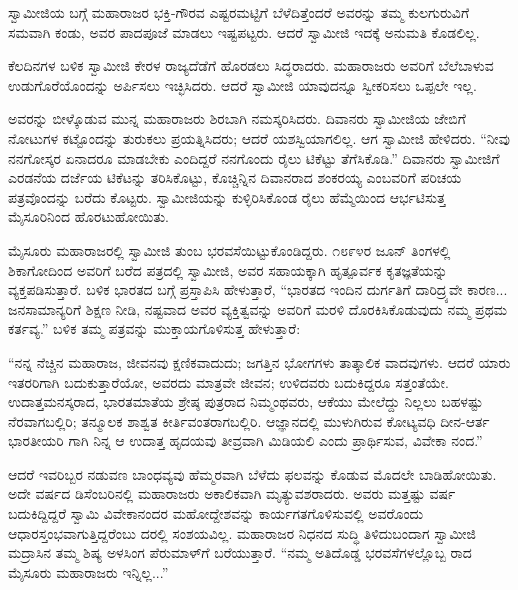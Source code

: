ಸ್ವಾಮೀಜಿಯ ಬಗ್ಗೆ ಮಹಾರಾಜರ ಭಕ್ತಿ-ಗೌರವ ಎಷ್ಟರಮಟ್ಟಿಗೆ ಬೆಳೆದಿತ್ತೆಂದರೆ ಅವರನ್ನು ತಮ್ಮ ಕುಲಗುರುವಿಗೆ ಸಮವಾಗಿ ಕಂಡು, ಅವರ ಪಾದಪೂಜೆ ಮಾಡಲು ಇಷ್ಟಪಟ್ಟರು. ಆದರೆ ಸ್ವಾಮೀಜಿ ಇದಕ್ಕೆ ಅನುಮತಿ ಕೊಡಲಿಲ್ಲ.

ಕೆಲದಿನಗಳ ಬಳಿಕ ಸ್ವಾಮೀಜಿ ಕೇರಳ ರಾಜ್ಯದೆಡೆಗೆ ಹೊರಡಲು ಸಿದ್ಧರಾದರು. ಮಹಾರಾಜರು ಅವರಿಗೆ ಬೆಲೆಬಾಳುವ ಉಡುಗೊರೆಯೊಂದನ್ನು ಅರ್ಪಿಸಲು ಇಚ್ಛಿಸಿದರು. ಆದರೆ ಸ್ವಾಮೀಜಿ ಯಾವುದನ್ನೂ ಸ್ವೀಕರಿಸಲು ಒಪ್ಪಲೇ ಇಲ್ಲ.

ಅವರನ್ನು ಬೀಳ್ಕೊಡುವ ಮುನ್ನ ಮಹಾರಾಜರು ಶಿರಬಾಗಿ ನಮಸ್ಕರಿಸಿದರು. ದಿವಾನರು ಸ್ವಾಮೀಜಿಯ ಜೇಬಿಗೆ ನೋಟುಗಳ ಕಟ್ಟೊಂದನ್ನು ತುರುಕಲು ಪ್ರಯತ್ನಿಸಿದರು; ಆದರೆ ಯಶಸ್ವಿಯಾಗಲಿಲ್ಲ. ಆಗ ಸ್ವಾಮೀಜಿ ಹೇಳಿದರು. “ನೀವು ನನಗೋಸ್ಕರ ಏನಾದರೂ ಮಾಡಬೇಕು ಎಂದಿದ್ದರೆ ನನಗೊಂದು ರೈಲು ಟಿಕೆಟ್ಟು ತೆಗೆಸಿಕೊಡಿ.” ದಿವಾನರು ಸ್ವಾಮೀಜಿಗೆ ಎರಡನೆಯ ದರ್ಜೆಯ ಟಿಕೆಟನ್ನು ತರಿಸಿಕೊಟ್ಟು, ಕೊಚ್ಚಿನ್ನಿನ ದಿವಾನರಾದ ಶಂಕರಯ್ಯ ಎಂಬವರಿಗೆ ಪರಿಚಯ ಪತ್ರವೊಂದನ್ನು ಬರೆದು ಕೊಟ್ಟರು. ಸ್ವಾಮೀಜಿಯನ್ನು ಕುಳ್ಳಿರಿಸಿಕೊಂಡ ರೈಲು ಹೆಮ್ಮೆಯಿಂದ ಆರ್ಭಟಿಸುತ್ತ ಮೈಸೂರಿನಿಂದ ಹೊರಟುಹೋಯಿತು.

ಮೈಸೂರು ಮಹಾರಾಜರಲ್ಲಿ ಸ್ವಾಮೀಜಿ ತುಂಬ ಭರವಸೆಯಿಟ್ಟುಕೊಂಡಿದ್ದರು. ೧೮೯೪ರ ಜೂನ್ ತಿಂಗಳಲ್ಲಿ ಶಿಕಾಗೋದಿಂದ ಅವರಿಗೆ ಬರೆದ ಪತ್ರದಲ್ಲಿ ಸ್ವಾಮೀಜಿ, ಅವರ ಸಹಾಯಕ್ಕಾಗಿ ಹೃತ್ಪೂರ್ವಕ ಕೃತಜ್ಞತೆಯನ್ನು ವ್ಯಕ್ತಪಡಿಸುತ್ತಾರೆ. ಬಳಿಕ ಭಾರತದ ಬಗ್ಗೆ ಪ್ರಸ್ತಾಪಿಸಿ ಹೇಳುತ್ತಾರೆ, “ಭಾರತದ ಇಂದಿನ ದುರ್ಗತಿಗೆ ದಾರಿದ್ರ್ಯವೇ ಕಾರಣ... ಜನಸಾಮಾನ್ಯರಿಗೆ ಶಿಕ್ಷಣ ನೀಡಿ, ನಷ್ಟವಾದ ಅವರ ವ್ಯಕ್ತಿತ್ವವನ್ನು ಅವರಿಗೆ ಮರಳಿ ದೊರಕಿಸಿಕೊಡುವುದು ನಮ್ಮ ಪ್ರಥಮ ಕರ್ತವ್ಯ.” ಬಳಿಕ ತಮ್ಮ ಪತ್ರವನ್ನು ಮುಕ್ತಾಯಗೊಳಿಸುತ್ತ ಹೇಳುತ್ತಾರೆ:

“ನನ್ನ ನೆಚ್ಚಿನ ಮಹಾರಾಜ, ಜೀವನವು ಕ್ಷಣಿಕವಾದುದು; ಜಗತ್ತಿನ ಭೋಗಗಳು ತಾತ್ಕಾಲಿಕ ವಾದವುಗಳು. ಆದರೆ ಯಾರು ಇತರರಿಗಾಗಿ ಬದುಕುತ್ತಾರೆಯೋ, ಅವರದು ಮಾತ್ರವೇ ಜೀವನ; ಉಳಿದವರು ಬದುಕಿದ್ದರೂ ಸತ್ತಂತೆಯೇ.  ಉದಾತ್ತಮನಸ್ಕರಾದ, ಭಾರತಮಾತೆಯ ಶ್ರೇಷ್ಠ ಪುತ್ರರಾದ ನಿಮ್ಮಂಥವರು, ಆಕೆಯು ಮೇಲೆದ್ದು ನಿಲ್ಲಲು ಬಹಳಷ್ಟು ನೆರವಾಗಬಲ್ಲಿರಿ; ತನ್ಮೂಲಕ ಶಾಶ್ವತ ಕೀರ್ತಿವಂತರಾಗಬಲ್ಲಿರಿ. ಆಜ್ಞಾನದಲ್ಲಿ ಮುಳುಗಿರುವ ಕೋಟ್ಯವಧಿ ದೀನ-ಆರ್ತ ಭಾರತೀಯರಿ ಗಾಗಿ ನಿನ್ನ ಆ ಉದಾತ್ತ ಹೃದಯವು ತೀವ್ರವಾಗಿ ಮಿಡಿಯಲಿ ಎಂದು ಪ್ರಾರ್ಥಿಸುವ, ವಿವೇಕಾ ನಂದ.”

ಆದರೆ ಇವರಿಬ್ಬರ ನಡುವಣ ಬಾಂಧವ್ಯವು ಹೆಮ್ಮರವಾಗಿ ಬೆಳೆದು ಫಲವನ್ನು ಕೊಡುವ ಮೊದಲೇ ಬಾಡಿಹೋಯಿತು. ಅದೇ ವರ್ಷದ ಡಿಸೆಂಬರಿನಲ್ಲಿ ಮಹಾರಾಜರು ಅಕಾಲಿಕವಾಗಿ ಮೃತ್ಯುವಶರಾದರು. ಅವರು ಮತ್ತಷ್ಟು ವರ್ಷ ಬದುಕಿದ್ದಿದ್ದರೆ ಸ್ವಾಮಿ ವಿವೇಕಾನಂದರ ಮಹೋದ್ದೇಶವನ್ನು ಕಾರ್ಯಗತಗೊಳಿಸುವಲ್ಲಿ ಅವರೊಂದು ಆಧಾರಸ್ತಂಭವಾಗುತ್ತಿದ್ದರೆಂಬು ದರಲ್ಲಿ ಸಂಶಯವಿಲ್ಲ. ಮಹಾರಾಜರ ನಿಧನದ ಸುದ್ಧಿ ತಿಳಿದುಬಂದಾಗ ಸ್ವಾಮೀಜಿ ಮದ್ರಾಸಿನ ತಮ್ಮ ಶಿಷ್ಯ ಅಳಸಿಂಗ ಪೆರುಮಾಳ್​ಗೆ ಬರೆಯುತ್ತಾರೆ. “ನಮ್ಮ ಅತಿದೊಡ್ಡ ಭರವಸೆಗಳಲ್ಲೊಬ್ಬ ರಾದ ಮೈಸೂರು ಮಹಾರಾಜರು ಇನ್ನಿಲ್ಲ...”

